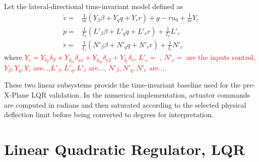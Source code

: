\documentclass[10pt]{article}
\begin{document}
Let the lateral-directional
time-invariant model defined as
\begin{align}
    \dot{v}=&\frac{1}{m}(Y_\beta\beta+Y_q q+Y_r r)+g-ru_0+\frac{1}{m}Y_c\nonumber\\
    \dot{p}=&\frac{1}{I_x}(L'_\beta\beta+L'_q q+L'_r r)+\frac{1}{I_x}L'_c\nonumber\\
    \dot{r}=&\frac{1}{I_z}(N'_\beta\beta+N'_q q+N'_r r)+\frac{1}{I_z}N'_c\nonumber
\end{align}
where \textcolor{red}{$Y_c=Y_{\delta_T}\delta_T+Y_{\delta_{a1}}\delta_{a1}+Y_{\delta_{a2}}\delta_{e2}+Y_{\delta_r}\delta_r$, $L'_c=$ , $N'_c=$ are the inputs control, $Y_\beta, Y_q, Y_r$ are...,$L'_\beta, L'_q, L'_r$ are..., $N'_\beta, N'_q, N'_r$ are....
}

These two linear subsystems provide the time-invariant baseline used for
the pre-X-Plane LQR validation. In the numerical implementation, actuator
commands are computed in radians and then saturated according to the
selected physical deflection limit before being converted to degrees for
interpretation.

\section{Linear Quadratic Regulator, LQR}
\end{document}
